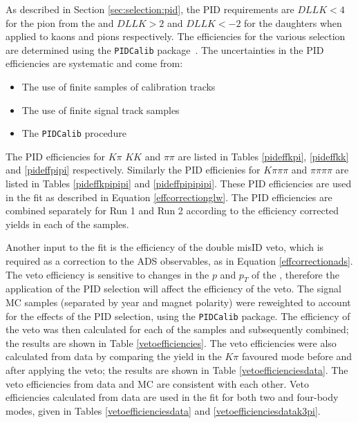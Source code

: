 As described in Section \ref{sec:selection:pid}, the PID requirements are $DLLK < 4$ for the pion from the \Kstarm and $DLLK > 2$ and $DLLK < -2$ for the \D daughters when applied to kaons and pions respectively. The efficiencies for the various selection are determined using the {\tt PIDCalib} package~\cite{PIDCalib}. The uncertainties in the PID efficiencies are systematic and come from:

\begin{itemize}
\item The use of finite samples of \Dstar calibration tracks
\item The use of finite signal track samples
\item The {\tt PIDCalib} procedure
\end{itemize}

The PID efficiencies for $K\pi$ $KK$ and $\pi\pi$ are listed in Tables \ref{pideffkpi}, \ref{pideffkk} and \ref{pideffpipi} respectively. Similarly the PID efficienies for $K\pi\pi\pi$ and $\pi\pi\pi\pi$ are listed in Tables \ref{pideffkpipipi} and \ref{pideffpipipipi}. These PID efficiencies are used in the \CP fit as described in Equation \ref{effcorrectionglw}. The PID efficiencies are combined separately for Run 1 and Run 2 according to the efficiency corrected yields in each of the samples. 

Another input to the fit is the efficiency of the double misID veto, which is required as a correction to the ADS observables, as in Equation \ref{effcorrectionads}. The veto efficiency is sensitive to changes in the $p$ and $p_T$ of the \Dz, therefore the application of the PID selection will affect the efficiency of the veto. The signal MC samples (separated by year and magnet polarity) were reweighted to account for the effects of the PID selection, using the {\tt PIDCalib} package. The efficiency of the veto was then calculated for each of the samples and subsequently combined; the results are shown in Table \ref{vetoefficiencies}. The veto efficiencies were also calculated from data by comparing the yield in the $K\pi$ favoured mode before and after applying the veto; the results are shown in Table \ref{vetoefficienciesdata}. The veto efficiencies from data and MC are consistent with each other. Veto efficiencies calculated from data are used in the \CP fit for both two and four-body modes, given in Tables \ref{vetoefficienciesdata} and \ref{vetoefficienciesdatak3pi}.

